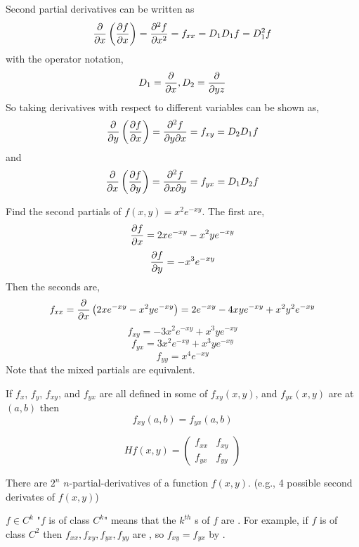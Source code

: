 \documentclass[english, 11pt]{article}
\begin{document}
  \begin{notation}
    Second partial derivatives can be written as
  \[ \frac{\partial}{\partial x} \left( \frac{\partial f}{\partial x} \right) = \frac{\partial^2 f}{\partial x^2} = f_{xx} = D_1D_1f = D_1^2f \]
  with the operator notation,
  \[ D_1 = \frac{\partial}{\partial x}, D_2 = \frac{\partial}{\partial yz} \]
  So taking derivatives with respect to different variables can be shown as,
  \[ \frac{\partial}{\partial y} \left( \frac{\partial f}{\partial x} \right) = \frac{\partial^2 f}{\partial y \partial x} = f_{xy}= D_2D_1f \]
  and
  \[ \frac{\partial}{\partial x} \left( \frac{\partial f}{\partial y} \right) = \frac{\partial^2 f}{\partial x \partial y} = f_{yx}= D_1D_2f \]
  \end{notation}

  \begin{exmp}
    Find the second partials of $f(x,y) = x^2e^{-xy}$. The first are,
    \[ \frac{\partial f}{\partial x} = 2xe^{-xy} - x^2ye^{-xy} \]
    \[ \frac{\partial f}{\partial y} = -x^3e^{-xy} \]
    Then the seconds are,
    \[ f_{xx} = \frac{\partial}{\partial x} \left( 2xe^{-xy} - x^2ye^{-xy} \right) = 2e^{-xy} - 4xye^{-xy} + x^2y^2e^{-xy}  \]
    \[ f_{xy} = -3x^2e^{-xy} + x^3ye^{-xy} \]
    \[ f_{yx} =3x^2e^{-xy} + x^3ye^{-xy} \]
    \[ f_{yy} = x^4e^{-xy} \]
    Note that the mixed partials are equivalent.
  \end{exmp}

  \begin{thrm}\label{clairaut}
    If $f_x$, $f_y$, $f_{xy}$, and $f_{yx}$ are all defined in some  of $f_{xy}(x,y)$, and $f_{yx}(x,y)$ are  at $(a,b)$ then
    \[ f_{xy}(a,b) = f_{yx}(a,b) \]
  \end{thrm}

  \begin{defn}\label{hessian}
    \[ Hf(x,y) =  \left(\begin{matrix} f_{xx} & f_{xy} \\ f_{yx} & f_{yy} \end{matrix}\right) \]
  \end{defn}

  \begin{rem}
    There are $2^n$ $n$-partial-derivatives of a function $f(x,y)$. (e.g., 4 possible second derivates of $f(x,y)$)
  \end{rem}

  \begin{defn}[class]\label{class}
    $f \in C^k$ "$f$ is of class $C^k$" means that the $k^{th}$ s of $f$ are . For example, if $f$ is of class $C^2$ then $f_{xx},f_{xy},f_{yx},f_{yy}$ are , so $f_{xy} = f_{yx}$ by .
  \end{defn}
\end{document}
